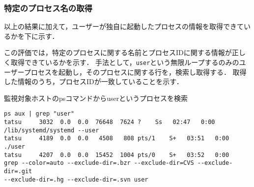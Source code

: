 
\subsubsection{特定のプロセス名の取得}

以上の結果に加えて，ユーザーが独自に起動したプロセスの情報を取得できているかを下に示す．

この評価では，特定のプロセスに関する名前とプロセスIDに関する情報が正しく取得できているかを示す．
手法として，\verb|user|という無限ループするのみのユーザープロセスを起動し，そのプロセスに関する行を，検索し取得する．
取得した情報のうち，プロセスIDが一致していることを示す．

\begin{itembox}[l]{監視対象ホストのpsコマンドからuserというプロセスを検索}
    \begin{verbatim}
ps aux | grep "user"
tatsu     3032  0.0  0.0  76648  7624 ?    Ss   02:47   0:00
/lib/systemd/systemd --user
tatsu     4189  0.0  0.0   4508   808 pts/1    S+   03:51   0:00 ./user
tatsu     4207  0.0  0.0  15452  1004 pts/0    S+   03:52   0:00
grep --color=auto --exclude-dir=.bzr --exclude-dir=CVS --exclude-dir=.git
--exclude-dir=.hg --exclude-dir=.svn user
    \end{verbatim}
\end{itembox}

